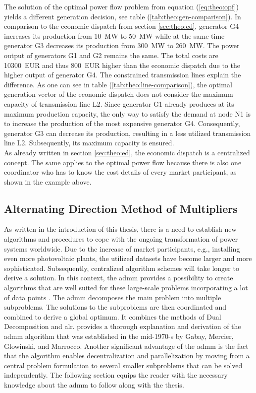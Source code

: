 The solution of the optimal power flow problem from equation (\ref{eq:theo:opf}) yields a different generation decision, see table (\ref{tab:theo:gen-comparison}). In comparison to the economic dispatch from section \ref{sec:theo:ed}, generator G4 increases its production from \SI{10}{\mega\watt} to \SI{50}{\mega\watt} while at the same time generator G3 decreases its production from \SI{300}{\mega\watt} to \SI{260}{\mega\watt}. The power output of generators G1 and G2 remains the same. The total costs are \SI{10300}{EUR} and thus \SI{800}{EUR} higher than the economic dispatch due to the higher output of generator G4. The constrained transmission lines explain the difference. As one can see in table (\ref{tab:theo:line-comparison}), the optimal generation vector of the economic dispatch does not consider the maximum capacity of transmission line L2. Since generator G1 already produces at its maximum production capacity, the only way to satisfy the demand at node N1 is to increase the production of the most expensive generator G4. Consequently, generator G3 can decrease its production, resulting in a less utilized transmission line L2. Subsequently, its maximum capacity is ensured. \\

As already written in section \ref{sec:theo:ed}, the economic dispatch is a centralized concept. The same applies to the optimal power flow because there is also one coordinator who has to know the cost details of every market participant, as shown in the example above. 

\subsection{Alternating Direction Method of Multipliers}
\label{sec:theo:admm}

As written in the introduction of this thesis, there is a need to establish new algorithms and procedures to cope with the ongoing transformation of power systems worldwide. Due to the increase of market participants, e.g., installing even more photovoltaic plants, the utilized datasets have become larger and more sophisticated. Subsequently, centralized algorithm schemes will take longer to derive a solution. In this context, the \gls{admm} provides a possibility to create algorithms that are well suited for these large-scale problems incorporating a lot of data points \citep{boyd2010}. The \gls{admm} decomposes the main problem into multiple subproblems. The solutions to the subproblems are then coordinated and combined to derive a global optimum. It combines the methods of Dual Decomposition and \gls{alr}. \citet{boyd2010} provides a thorough explanation and derivation of the \gls{admm} algorithm that was established in the mid-1970-s by Gabay, Mercier, Glowinski, and Marrocco. Another significant advantage of the \gls{admm} is the fact that the algorithm enables decentralization and parallelization by moving from a central problem formulation to several smaller subproblems that can be solved independently. The following section equips the reader with the necessary knowledge about the \gls{admm} to follow along with the thesis.\\

